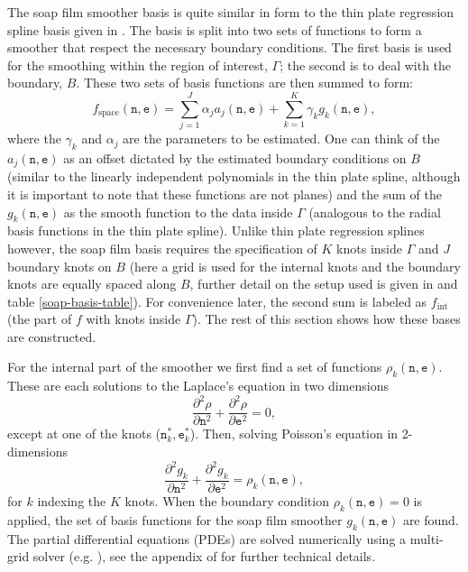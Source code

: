 The soap film smoother basis is quite similar in form to the thin plate regression spline basis given in . The basis is split into two sets of functions to form a smoother that respect the necessary boundary conditions. The first basis is used for the smoothing within the region of interest, $\Gamma$; the second is to deal with the boundary, $B$. These two sets of basis functions are then summed to form:
\begin{equation*}
f_\text{space}(\texttt{n},\texttt{e})=\sum_{j=1}^J \alpha_j a_j(\texttt{n},\texttt{e}) + \sum_{k=1}^K \gamma_k g_k(\texttt{n},\texttt{e}),
\end{equation*}
where the $\gamma_k$ and $\alpha_j$ are the parameters to be estimated. One can think of the $a_j(\texttt{n},\texttt{e})$ as an offset dictated by the estimated boundary conditions on $B$ (similar to the linearly independent polynomials in the thin plate spline, although it is important to note that these functions are not planes) and the sum of the $g_k(\texttt{n},\texttt{e})$ as the smooth function to the data inside $\Gamma$ (analogous to the radial basis functions in the thin plate spline). Unlike thin plate regression splines however, the soap film basis requires the specification of $K$ knots inside $\Gamma$ and $J$ boundary knots on $B$ (here a grid is used for the internal knots and the boundary knots are equally spaced along $B$, further detail on the setup used is given in  and table \ref{soap-basis-table}). For convenience later, the second sum is labeled as $f_\text{int}$ (the part of $f$ with knots inside $\Gamma$). The rest of this section shows how these bases are constructed.

For the internal part of the smoother we first find a set of functions $\rho_k(\texttt{n},\texttt{e})$. These are each solutions to the Laplace's equation in two dimensions
$$
\frac{\partial^2\rho}{\partial \texttt{n}^2} + \frac{\partial^2\rho}{\partial \texttt{e}^2} = 0,
$$
except at one of the knots ($\texttt{n}^*_k,\texttt{e}^*_k$). Then, solving Poisson's equation in 2-dimensions
\begin{equation}
\frac{\partial^2 g_k}{\partial \texttt{n}^2} + \frac{\partial^2 g_k}{\partial \texttt{e}^2} = \rho_k(\texttt{n},\texttt{e}),
\label{soap-poisson}
\end{equation}
for $k$ indexing the $K$ knots. When the boundary condition $\rho_k(\texttt{n},\texttt{e})=0$ is applied, the set of basis functions for the soap film smoother $g_k(\texttt{n},\texttt{e})$ are found.  The partial differential equations (PDEs) are solved numerically using a multi-grid solver (e.g. \cite[pp. 862-880]{press1992numerical}), see the appendix of \cite{soap} for further technical details.

